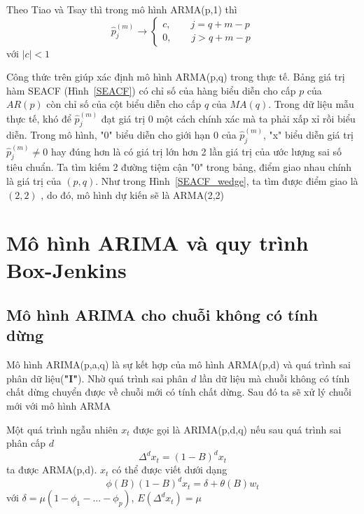 Theo Tiao và Tsay \citep{tiao} thì trong mô hình ARMA(p,1) thì 
\[
	\hat{p}_j^{(m)} \longrightarrow \begin{cases}
										c,\qquad j = q+m-p \\
										0,\qquad j > q+m-p
										\end{cases}
\]\label{SEACFequa} với $|c|<1$

Công thức trên giúp xác định mô hình ARMA(p,q) trong thực tế. Bảng giá trị hàm SEACF (Hình~\ref{SEACF}) có chỉ số của hàng biểu diễn cho cấp $p$ của $AR(p)$ còn chỉ số của cột biểu diễn cho cấp $q$ của $MA(q)$. %
 Trong dữ liệu mẫu thực tế, khó để $\hat{p}_j^{(m)}$ đạt giá trị 0 một cách chính xác mà ta phải xấp xỉ rồi biểu diễn. Trong mô hình, "0" biểu diễn cho giới hạn 0 của $\hat{p}_j^{(m)}$, "x" biểu diễn giá trị $\hat{p}_j^{(m)} \neq 0$ hay đúng hơn là có giá trị lớn hơn 2 lần giá trị của ước lượng sai số tiêu chuẩn. Ta tìm kiếm 2 đường tiệm cận "0" trong bảng, điểm giao nhau chính là giá trị của $(p,q)$. Như trong Hình~\ref{SEACF_wedge}, ta tìm được điểm giao là $(2,2)$ , do đó, mô hình dự kiến sẽ là ARMA(2,2)
\section{Mô hình ARIMA và quy trình Box-Jenkins \citep{box94}}


\subsection{Mô hình ARIMA cho chuỗi không có tính dừng}
Mô hình ARIMA(p,a,q) là sự kết hợp của mô hình ARMA(p,d) và quá trình sai phân dữ liệu(\textbf{"I"}). Nhờ quá trình sai phân $d$ lần dữ liệu mà chuỗi không có tính chất dừng chuyển được về chuỗi mới có tính chất dừng. Sau đó ta sẽ xử lý chuỗi mới với mô hình ARMA
\begin{defi}
Một quá trình ngẫu nhiên $x_t$ được gọi là ARIMA(p,d,q) nếu sau quá trình sai phân cấp $d$
 \begin{equation}
\Delta^{d}x_t = (1-B)^{d}x_t
\end{equation}
ta được ARMA(p,d). $x_t$ có thể được viết dưới dạng
\begin{equation}
	\phi(B)(1-B)^{d}x_t = \delta + \theta(B)w_t
\end{equation}
với $\delta = \mu(1-\phi_1 - ... - \phi_p)$, $E(\Delta^{d}x_t)= \mu$
\end{defi}

